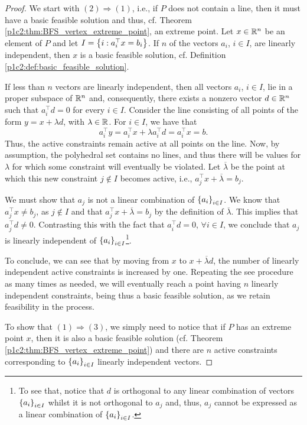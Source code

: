 \begin{proof}
We start with $(2) \Rightarrow (1)$, i.e., if $P$ does not contain a line, then it must have a basic feasible solution and thus, cf. Theorem \ref{p1c2:thm:BFS_vertex_extreme_point}, an extreme point. Let $x \in \mathbb{R}^n$ be an element of $P$ and let $I = \left\{ i : a_i^\top x = b_i \right \}$. If $n$ of the vectors $a_i$, $i \in I$, are linearly independent, then $x$ is a basic feasible solution, cf. Definition \ref{p1c2:def:basic_feasible_solution}. 

If less than $n$ vectors are linearly independent, then all vectors $a_i$, $i \in I$, lie in a proper subspace of $\mathbb{R}^n$ and, consequently, there exists a nonzero vector $d \in \mathbb{R}^n$ such that $a_i^\top d = 0$ for every $i \in I$. Consider the line consisting of all points of the form $y = x + \lambda d$, with $\lambda \in \mathbb{R}$. For $i \in I$, we have that 
	$$
	a_i^\top y = a_i^\top x + \lambda a_i^\top d = a_i^\top x = b.
	$$
	Thus, the active constraints remain active at all points on the line. Now, by assumption, the polyhedral set contains no lines, and thus there will be values for $\lambda$ for which some constraint will eventually be violated. Let $\overline{\lambda}$ be the point at which this new constraint $j \not\in I$ becomes active, i.e., $a_j^\top x + \overline{\lambda}= b_j$.
	
	We must show that $a_j$ is not a linear combination of $\left\{ a_i \right \}_{i \in I}$. We know that $a_j^\top x \neq b_j$, as $j \not\in I$ and that $a_j^\top x + \overline{\lambda}= b_j$ by the definition of $\overline{\lambda}$. This implies that $a_j^\top d \neq 0$. Contrasting this with the fact that $a_i^\top d = 0$, $\forall i \in I$, we conclude that $a_j$ is linearly independent of $\left\{ a_i \right \}_{i \in I}$\footnote{To see that, notice that $d$ is orthogonal to any linear combination of vectors $\left\{ a_i \right \}_{i \in I}$ whilst it is not orthogonal to $a_j$ and, thus, $a_j$ cannot be expressed as a linear combination of $\left\{ a_i \right \}_{i \in I}$.}. 
	
	To conclude, we can see that by moving from $x$ to $x + \overline{\lambda}d$, the number of linearly independent active constraints is increased by one. Repeating the see procedure as many times as needed, we will eventually reach a point having $n$ linearly independent constraints, being thus a basic feasible solution, as we retain feasibility in the process.
	
	To show that $(1) \Rightarrow (3)$, we simply need to notice that if $P$ has an extreme point $x$, then it is also a basic feasible solution (cf. Theorem \ref{p1c2:thm:BFS_vertex_extreme_point}) and there are $n$ active constraints corresponding to $\left\{ a_i \right \}_{i \in I}$ linearly independent vectors.


\end{proof}
